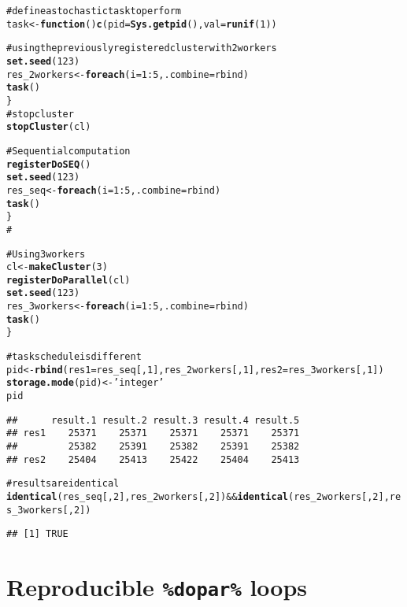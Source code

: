 \documentclass[a4paper,12pt]{article}\usepackage{graphicx, color}
\makeatletter
\newcommand{\hlfunctioncall}[1]{\textcolor[rgb]{0.501960784313725,0,0.329411764705882}{\textbf{#1}}}%
\newcommand{\hlstring}[1]{\textcolor[rgb]{0.6,0.6,1}{#1}}%
\newcommand{\hlcomment}[1]{\textcolor[rgb]{0.180392156862745,0.6,0.341176470588235}{#1}}%
\newenvironment{kframe}{%
 \def\at@end@of@kframe{}%
 \ifinner\ifhmode%
  \def\at@end@of@kframe{\end{minipage}}%
  \begin{minipage}{\columnwidth}%
 \fi\fi%
 \def\FrameCommand##1{\hskip\@totalleftmargin \hskip-\fboxsep
 \colorbox{shadecolor}{##1}\hskip-\fboxsep
     \hskip-\linewidth \hskip-\@totalleftmargin \hskip\columnwidth}%
 \MakeFramed {\advance\hsize-\width
   \@totalleftmargin\z@ \linewidth\hsize
   \@setminipage}}%
 {\par\unskip\endMakeFramed%
 \at@end@of@kframe}
\newenvironment{knitrout}{}{} %
\renewenvironment{knitrout}{\begin{footnotesize}}{\end{footnotesize}}
\makeatother
\begin{document}
\begin{knitrout}
\color{fgcolor}\begin{kframe}
\begin{alltt}

\hlcomment{# define a stochastic task to perform}
task <- \hlfunctioncall{function}() \hlfunctioncall{c}(pid=\hlfunctioncall{Sys.getpid}(), val=\hlfunctioncall{runif}(1))

\hlcomment{# using the previously registered cluster with 2 workers}
\hlfunctioncall{set.seed}(123)
res_2workers <- \hlfunctioncall{foreach}(i=1:5, .combine=rbind) %dorng% \{
	\hlfunctioncall{task}()
\}
\hlcomment{# stop cluster}
\hlfunctioncall{stopCluster}(cl)

\hlcomment{# Sequential computation}
\hlfunctioncall{registerDoSEQ}()
\hlfunctioncall{set.seed}(123)
res_seq <- \hlfunctioncall{foreach}(i=1:5, .combine=rbind) %dorng% \{
	\hlfunctioncall{task}() 
\}
\hlcomment{#}

\hlcomment{# Using 3 workers}
cl <- \hlfunctioncall{makeCluster}(3)
\hlfunctioncall{registerDoParallel}(cl)
\hlfunctioncall{set.seed}(123)
res_3workers <- \hlfunctioncall{foreach}(i=1:5, .combine=rbind) %dorng% \{ 
	\hlfunctioncall{task}()
\}

\hlcomment{# task schedule is different}
pid <- \hlfunctioncall{rbind}(res1=res_seq[,1], res_2workers[,1], res2=res_3workers[,1])
\hlfunctioncall{storage.mode}(pid) <- \hlstring{'integer'}
pid
\end{alltt}
\begin{verbatim}
##      result.1 result.2 result.3 result.4 result.5
## res1    25371    25371    25371    25371    25371
##         25382    25391    25382    25391    25382
## res2    25404    25413    25422    25404    25413
\end{verbatim}
\begin{alltt}
\hlcomment{# results are identical}
\hlfunctioncall{identical}(res_seq[,2], res_2workers[,2]) && \hlfunctioncall{identical}(res_2workers[,2], res_3workers[,2])
\end{alltt}
\begin{verbatim}
## [1] TRUE
\end{verbatim}
\end{kframe}
\end{knitrout}


\section{Reproducible \texttt{\%dopar\%} loops}
\end{document}
